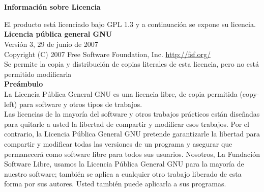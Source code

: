 


\chapter*{}

 \begin{center}

      \textbf{Información sobre Licencia}


\end{center}

El producto está licenciado bajo GPL 1.3 y a continuación se expone su licencia.\\

\textbf{Licencia pública general GNU}\\

Versión 3, 29 de junio de 2007\\

Copyright (C) 2007 Free Software Foundation, Inc. \url{http://fsf.org/}\\

Se  permite  la  copia  y  distribución  de  copias  literales  de  esta  licencia,  pero  no está permitido modificarla\\

\textbf{Preámbulo}\\

La Licencia Pública General GNU es una licencia libre, de copia permitida (copy-left) para software y otros tipos de trabajos.\\

Las licencias de la mayoría del software y otros trabajos prácticos están diseñadas para quitarle a usted la libertad de compartir y modificar esos trabajos. Por el contrario, la Licencia Pública General GNU pretende garantizarle la libertad para compartir y modificar todas las versiones de un programa y asegurar que permanecerá como software libre para todos sus usuarios. Nosotros, La Fundación Software Libre, usamos la Licencia Pública General GNU para la mayoría de nuestro software; también se aplica a cualquier otro trabajo liberado de esta forma por sus autores. Usted también puede aplicarla a sus programas.\\

